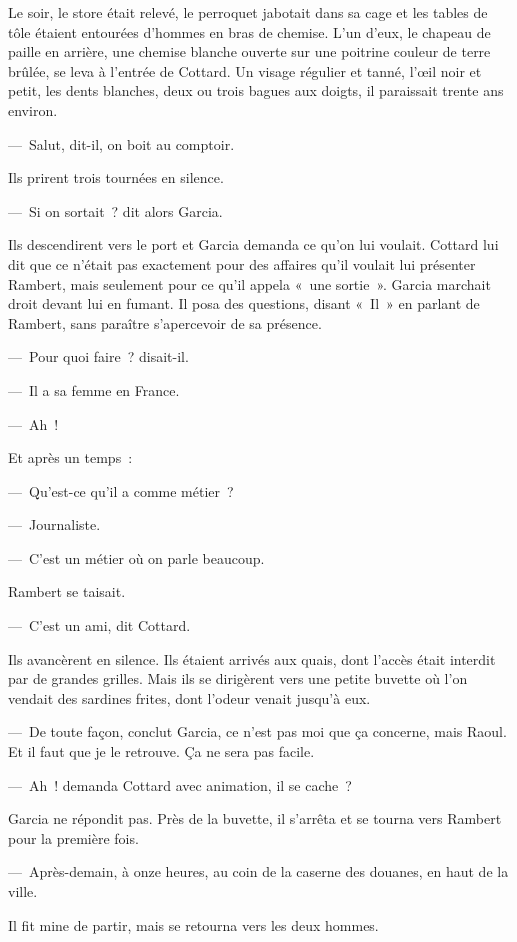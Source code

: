\documentclass[french,twoside]{book} %
\begin{document}
Le soir, le store était relevé, le perroquet jabotait dans sa cage et les tables de tôle étaient entourées d’hommes en bras de chemise. L’un d’eux, le chapeau de paille en arrière, une chemise blanche ouverte sur une poitrine couleur de terre brûlée, se leva à l’entrée de Cottard. Un visage régulier et tanné, l’œil noir et petit, les dents blanches, deux ou trois bagues aux doigts, il paraissait trente ans environ.\par
— Salut, dit-il, on boit au comptoir.\par
Ils prirent trois tournées en silence.\par
— Si on sortait ? dit alors Garcia.\par
Ils descendirent vers le port et Garcia demanda ce qu’on lui voulait. Cottard lui dit que ce n’était pas exactement pour des affaires qu’il voulait lui présenter Rambert, mais seulement pour ce qu’il appela « une sortie ». Garcia marchait droit devant lui en fumant. Il posa des questions, disant « Il » en parlant de Rambert, sans paraître s’apercevoir de sa présence.\par
— Pour quoi faire ? disait-il.\par
— Il a sa femme en France.\par
— Ah !\par
Et après un temps :\par
— Qu’est-ce qu’il a comme métier ?\par
— Journaliste.\par
— C’est un métier où on parle beaucoup.\par
Rambert se taisait.\par
— C’est un ami, dit Cottard.\par
Ils avancèrent en silence. Ils étaient arrivés aux quais, dont l’accès était interdit par de grandes grilles. Mais ils se dirigèrent vers une petite buvette où l’on vendait des sardines frites, dont l’odeur venait jusqu’à eux.\par
— De toute façon, conclut Garcia, ce n’est pas moi que ça concerne, mais Raoul. Et il faut que je le retrouve. Ça ne sera pas facile.\par
— Ah ! demanda Cottard avec animation, il se cache ?\par
Garcia ne répondit pas. Près de la buvette, il s’arrêta et se tourna vers Rambert pour la première fois.\par
— Après-demain, à onze heures, au coin de la caserne des douanes, en haut de la ville.\par
Il fit mine de partir, mais se retourna vers les deux hommes.\par
\end{document}
